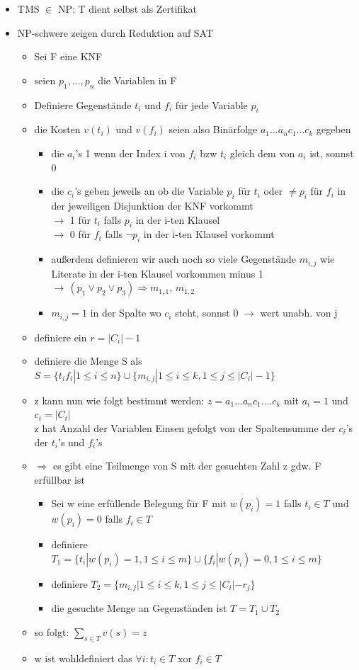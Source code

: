 \documentclass[12pt,a4paper]{article}
\begin{document}
\begin{itemize}
\item TMS $\in$ NP: T dient selbst als Zertifikat
\item NP-schwere zeigen durch Reduktion auf SAT
\begin{itemize}
\item Sei F eine KNF
\item seien $p_1, ..., p_n$ die Variablen in F
\item Definiere Gegenstände $t_i$ und $f_i$ für jede Variable $p_i$
\item die Kosten $v(t_i)$ und $v(f_i)$ seien also Binärfolge $a_1...a_n c_1...c_k$ gegeben
\begin{itemize}
\item die $a_i$'s 1 wenn der Index i von $f_i$ bzw $t_i$ gleich dem von $a_i$ ist, sonnst 0
\item die $c_i$'s geben jeweils an ob die Variable $p_i$ für $t_i$ oder $\neq p_i$ für $f_i$ in der jeweiligen Disjunktion der KNF vorkommt\\
$\rightarrow$ 1 für $t_i$ falls $p_i$ in der i-ten Klausel\\
$\rightarrow$ 0 für $f_i$ falls $\lnot p_i$ in der i-ten Klausel vorkommt
\item außerdem definieren wir auch noch so viele Gegenstände $m_{i,j}$ wie Literate in der i-ten Klausel vorkommen minus 1\\
$\rightarrow\, (p_1 \lor p_2 \lor p_3) \Rightarrow m_{1,1},\, m_{1,2}$
\item $m_{i,j} = 1$ in der Spalte wo $c_i$ steht, sonnst 0 $\rightarrow$ wert unabh. von j
\end{itemize}
\item definiere ein $r = |C_i| - 1$
\item definiere die Menge S als $S = \{t_i f_i | 1 \leq i \leq n \} \cup \{m_{i,j} | 1 \leq i \leq k, 1 \leq j \leq |C_i| -1 \}$
\item z kann nun wie folgt bestimmt werden: $z=a_1...a_n c_1....c_k$ mit $a_i = 1$ und $c_i = |C_i|$\\
z hat Anzahl der Variablen Einsen gefolgt von der Spaltensumme der $c_i$'s der $t_i$'s und $f_i$'s
\item $\Rightarrow$ es gibt eine Teilmenge von S mit der gesuchten Zahl z gdw. F erfüllbar ist
\begin{itemize}
\item Sei w eine erfüllende Belegung für F mit $w(p_i) = 1$ falls $t_i \in T$ und $w(p_i) = 0$ falls $f_i \in T$
\item definiere $T_1 = \{t_i | w(p_i) = 1, 1 \leq i \leq m \} \cup \{f_i | w(p_i) = 0, 1 \leq i \leq m \}$
\item definiere $T_2 = \{m_{i,j} | 1 \leq i \leq k, 1 \leq j \leq |C_i| - r_j \}$
\item die gesuchte Menge an Gegenständen ist $T = T_1 \cup T_2$
\end{itemize}
\item so folgt: $\sum_{s\in T} v(s) = z$
\item w ist wohldefiniert das $\forall i : t_i \in T \text{ xor } f_i \in T$
\end{itemize}
\end{itemize}
\end{document}
